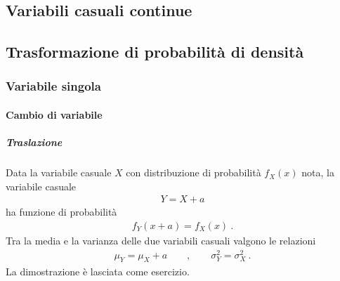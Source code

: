 \documentclass[letterpaper,10pt,italian]{jupyterBook}
\begin{document}
\subsection{Variabili casuali continue}
\label{\detokenize{ch/statistics/random_variables_continuous:variabili-casuali-continue}}\label{\detokenize{ch/statistics/random_variables_continuous:statistics-hs-random-variables-continuous}}\label{\detokenize{ch/statistics/random_variables_continuous::doc}}
\sphinxstepscope


\subsection{Trasformazione di probabilità di densità}
\label{\detokenize{ch/statistics/rv_pdf_transformations:trasformazione-di-probabilita-di-densita}}\label{\detokenize{ch/statistics/rv_pdf_transformations::doc}}

\subsubsection{Variabile singola}
\label{\detokenize{ch/statistics/rv_pdf_transformations:variabile-singola}}

\paragraph{Cambio di variabile}
\label{\detokenize{ch/statistics/rv_pdf_transformations:cambio-di-variabile}}

\subparagraph{Traslazione}
\label{\detokenize{ch/statistics/rv_pdf_transformations:traslazione}}
\sphinxAtStartPar
Data la variabile casuale \(X\) con distribuzione di probabilità \(f_X(x)\) nota, la variabile casuale
\begin{equation*}
\begin{split}Y = X + a\end{split}
\end{equation*}
\sphinxAtStartPar
ha funzione di probabilità
\begin{equation*}
\begin{split}f_Y(x+a) = f_X(x) \ .\end{split}
\end{equation*}
\sphinxAtStartPar
Tra la media e la varianza delle due variabili casuali valgono le relazioni
\begin{equation*}
\begin{split}\mu_Y = \mu_X + a \qquad , \qquad \sigma^2_Y = \sigma^2_X \ .\end{split}
\end{equation*}
\sphinxAtStartPar
La dimostrazione è lasciata come esercizio.
\end{document}
